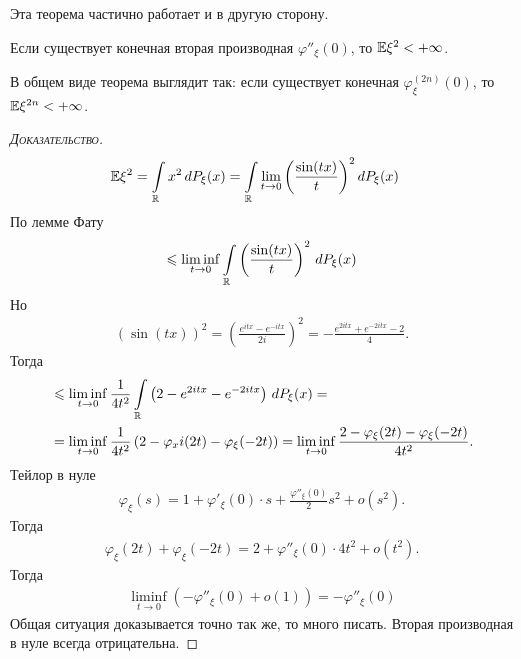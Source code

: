 \documentclass[../main.tex]{subfiles}
\begin{document}
Эта теорема частично работает и в другую сторону.

\begin{thm}
 Если существует конечная вторая производная $ \varphi''_\xi(0) $, то $ \mathbb E\xi^{2} < +\infty $.
\end{thm}
\begin{remrk*}
 В общем виде теорема выглядит так: если существует конечная $ \varphi^{(2n)}_\xi(0) $, то $ \mathbb E\xi^{2n} < +\infty $.
\end{remrk*}
\begin{proof}[\normalfont\textsc{Доказательство}]
 \begin{align*}
  \mathbb E\xi^{2} &= \int\limits_{\mathbb{R}} x^{2}\,dP_\xi(x) = \int\limits_{\mathbb{R}} \lim_{t \to 0} \left(\frac{\sin(tx)}{t} \right)  ^{2}dP_\xi(x)
 \end{align*} По лемме Фату
 \begin{align*}
  \leqslant \liminf_{t \to 0} \int\limits_{\mathbb{R}} \left( \frac{\sin(tx)}{t} \right)^{2}\,dP_\xi(x)
 \end{align*} Но
 \begin{align*}
  (\sin(tx))^{2} = \left( \frac{e^{itx} - e^{-itx}}{2i} \right)^{2} = -\frac{e^{2itx} + e^{-2itx}-2}{4}.
 \end{align*} Тогда
 \begin{align*}
  &\leqslant \liminf_{t \to 0} \frac{1}{4t^{2}} \int\limits_{\mathbb{R}} \left( 2-e^{2itx} -e^{-2itx} \right) \,dP_\xi(x) = \\
  &= \liminf_{t\to 0} \frac{1}{4t^{2}} \left( 2 - \varphi_xi(2t) - \varphi_\xi(-2t) \right) = \liminf_{ t\to 0} \frac{2  - \varphi_\xi(2t) - \varphi_\xi(-2t)}{4t^{2}}.
 \end{align*}
 Тейлор в нуле
 \begin{align*}
  \varphi_\xi(s) = 1 + \varphi'_\xi(0) \cdot s + \frac{\varphi''_\xi(0)}{2}s^{2} + o(s^{2}).
 \end{align*} Тогда
 \begin{align*}
  \varphi_\xi(2t) + \varphi_\xi(-2t) = 2 + \varphi''_\xi(0) \cdot 4t^{2} + o(t^{2}).
 \end{align*}
 Тогда
 \begin{align*}
  \liminf_{t \to 0} (-\varphi''_\xi(0) + o(1)) = -\varphi''_\xi(0)
 \end{align*} Общая ситуация доказывается точно так же, то много писать. Вторая производная в нуле всегда отрицательна.
\end{proof}
\end{document}
